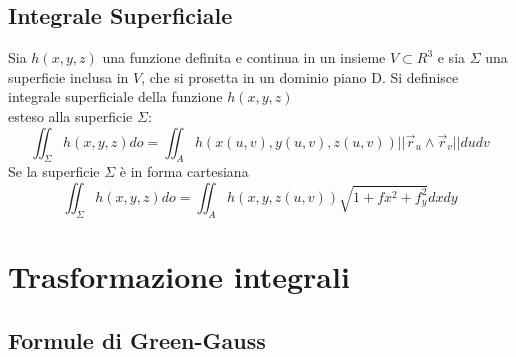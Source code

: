 \subsection{Integrale Superficiale}
Sia $h(x,y,z)$ una funzione definita e continua in un insieme $V \subset R^3$ e
sia $\Sigma$ una superficie inclusa in $V$, che si prosetta in un dominio piano
D. Si definisce {\color{red}integrale superficiale} della funzione $h(x,y,z)$\\
esteso alla superficie $\Sigma$:
\begin{equation*}
	\iint_\Sigma h(x,y,z)do=\iint_A h(x(u, v), y(u, v), z(u, v))||\vec{r}_u\wedge
	\vec{r}_v|| dudv
\end{equation*}
Se la superficie $\Sigma$ è in forma cartesiana
\begin{equation*}
	\iint_\Sigma h(x,y,z)do=\iint_A h(x, y, z(u, v))\sqrt{1+fx^2+f_y^2} dxdy
\end{equation*}
\clearpage
\section{Trasformazione integrali}
\subsection{Formule di Green-Gauss\label{fGreen-Gauss}}

